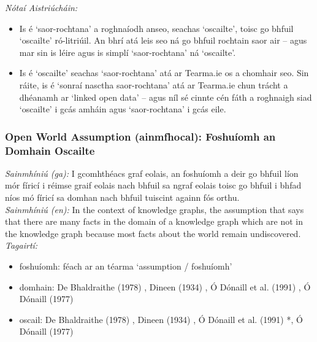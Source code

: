  \noindent \textit{Nótaí Aistriúcháin:}
\begin{itemize}
	\item Is é `saor-rochtana' a roghnaíodh anseo, seachas `oscailte', toisc go bhfuil `oscailte' ró-litriúil. An bhrí atá leis seo ná go bhfuil rochtain saor air -- agus mar sin is léire agus is simplí `saor-rochtana' ná `oscailte'.
	\item Is é `oscailte' seachas `saor-rochtana' atá ar Tearma.ie os a chomhair seo. Sin ráite, is é `sonraí nasctha saor-rochtana' atá ar Tearma.ie chun trácht a dhéanamh ar `linked open data' -- agus níl sé cinnte cén fáth a roghnaigh siad `oscailte' i gcás amháin agus `saor-rochtana' i gcás eile.
\end{itemize}


\subsubsection*{Open World Assumption (ainmfhocal): Foshuíomh an Domhain Oscailte}
 \noindent \textit{Sainmhíniú (ga):} I gcomhthéacs graf eolais, an foshuíomh a deir go bhfuil líon mór fíricí i réimse graif eolais nach bhfuil sa ngraf eolais toisc go bhfuil i bhfad níos mó fíricí sa domhan nach bhfuil tuiscint againn fós orthu.
\\
 \noindent \textit{Sainmhíniú (en):} In the context of knowledge graphs, the assumption that says that there are many facts in the domain of a knowledge graph which are not in the knowledge graph because most facts about the world remain undiscovered.
\\
 \noindent \textit{Tagairtí:}
\begin{itemize}
	\item foshuíomh: féach ar an téarma `assumption / foshuíomh'
	\item domhain: De Bhaldraithe (1978) \cite{de-bhaldraithe}, Dineen (1934) \cite{dineen}, Ó Dónaill et al. (1991) \cite{focloir-beag}, Ó Dónaill (1977) \cite{odonaill}
	\item oscail: De Bhaldraithe (1978) \cite{de-bhaldraithe}, Dineen (1934) \cite{dineen}, Ó Dónaill et al. (1991) \cite{focloir-beag}*, Ó Dónaill (1977) \cite{odonaill}
\end{itemize}

